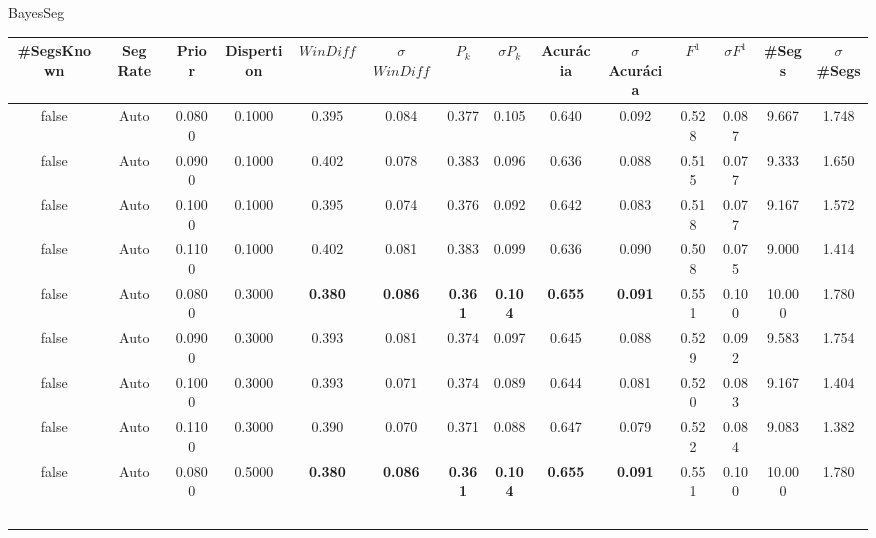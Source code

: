 


 \newpage
 \center BayesSeg
\begin{longtable}[c]{|c|c|c|c|c|c|c|c|c|c|c|c|c|c|} 
\hline 
 \#SegsKnown & Seg Rate & Prior & Dispertion & $WinDiff$ & $\sigma$$WinDiff$ & $P_k$ & $\sigma$$P_k$ & Acurácia & $\sigma$Acurácia & $F^1$ & $\sigma$$F^1$ & \#Segs & $\sigma$\#Segs\\ \hline 
 false & Auto & 0.0800 & 0.1000 & 0.395 & 0.084 & 0.377 & 0.105 & 0.640 & 0.092 & 0.528 & 0.087 & 9.667 & 1.748  \\ \hline 
  false & Auto & 0.0900 & 0.1000 & 0.402 & 0.078 & 0.383 & 0.096 & 0.636 & 0.088 & 0.515 & 0.077 & 9.333 & 1.650  \\ \hline 
  false & Auto & 0.1000 & 0.1000 & 0.395 & 0.074 & 0.376 & 0.092 & 0.642 & 0.083 & 0.518 & 0.077 & 9.167 & 1.572  \\ \hline 
  false & Auto & 0.1100 & 0.1000 & 0.402 & 0.081 & 0.383 & 0.099 & 0.636 & 0.090 & 0.508 & 0.075 & 9.000 & 1.414  \\ \hline 
  false & Auto & 0.0800 & 0.3000 & \cellcolor{gray!20} \textbf{0.380} & \cellcolor{gray!20} \textbf{0.086} & \cellcolor{gray!20} \textbf{0.361} & \cellcolor{gray!20} \textbf{0.104} & \cellcolor{gray!20} \textbf{0.655} & \cellcolor{gray!20} \textbf{0.091} & 0.551 & 0.100 & 10.000 & 1.780  \\ \hline 
  false & Auto & 0.0900 & 0.3000 & 0.393 & 0.081 & 0.374 & 0.097 & 0.645 & 0.088 & 0.529 & 0.092 & 9.583 & 1.754  \\ \hline 
  false & Auto & 0.1000 & 0.3000 & 0.393 & 0.071 & 0.374 & 0.089 & 0.644 & 0.081 & 0.520 & 0.083 & 9.167 & 1.404  \\ \hline 
  false & Auto & 0.1100 & 0.3000 & 0.390 & 0.070 & 0.371 & 0.088 & 0.647 & 0.079 & 0.522 & 0.084 & 9.083 & 1.382  \\ \hline 
  false & Auto & 0.0800 & 0.5000 & \cellcolor{gray!20} \textbf{0.380} & \cellcolor{gray!20} \textbf{0.086} & \cellcolor{gray!20} \textbf{0.361} & \cellcolor{gray!20} \textbf{0.104} & \cellcolor{gray!20} \textbf{0.655} & \cellcolor{gray!20} \textbf{0.091} & 0.551 & 0.100 & 10.000 & 1.780  \\ \hline 
$$
\end{longtable}
